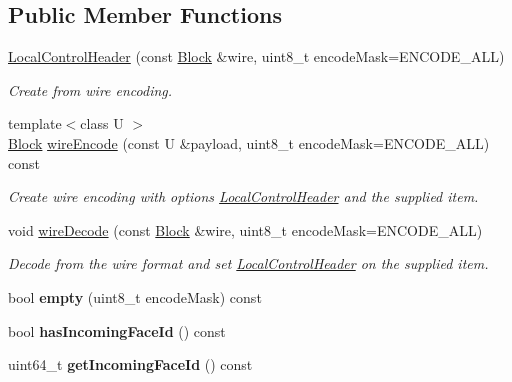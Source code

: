 \subsection*{Public Member Functions}
\begin{DoxyCompactItemize}
\item 
\hyperlink{classndn_1_1nfd_1_1LocalControlHeader_a6f3598290063fb83e55475dd2f8924c1}{Local\+Control\+Header} (const \hyperlink{classndn_1_1Block}{Block} \&wire, uint8\+\_\+t encode\+Mask=E\+N\+C\+O\+D\+E\+\_\+\+A\+LL)
\begin{DoxyCompactList}\small\item\em Create from wire encoding. \end{DoxyCompactList}\item 
{\footnotesize template$<$class U $>$ }\\\hyperlink{classndn_1_1Block}{Block} \hyperlink{classndn_1_1nfd_1_1LocalControlHeader_a04deac705d2498eaee39908230b994a8}{wire\+Encode} (const U \&payload, uint8\+\_\+t encode\+Mask=E\+N\+C\+O\+D\+E\+\_\+\+A\+LL) const
\begin{DoxyCompactList}\small\item\em Create wire encoding with options \hyperlink{classndn_1_1nfd_1_1LocalControlHeader}{Local\+Control\+Header} and the supplied item. \end{DoxyCompactList}\item 
void \hyperlink{classndn_1_1nfd_1_1LocalControlHeader_ab6fce3742d692d0f2b1c2a56234e95ac}{wire\+Decode} (const \hyperlink{classndn_1_1Block}{Block} \&wire, uint8\+\_\+t encode\+Mask=E\+N\+C\+O\+D\+E\+\_\+\+A\+LL)
\begin{DoxyCompactList}\small\item\em Decode from the wire format and set \hyperlink{classndn_1_1nfd_1_1LocalControlHeader}{Local\+Control\+Header} on the supplied item. \end{DoxyCompactList}\item 
bool {\bfseries empty} (uint8\+\_\+t encode\+Mask) const\hypertarget{classndn_1_1nfd_1_1LocalControlHeader_ae7271a522dcc884f6f8d51e674cabdcd}{}\label{classndn_1_1nfd_1_1LocalControlHeader_ae7271a522dcc884f6f8d51e674cabdcd}

\item 
bool {\bfseries has\+Incoming\+Face\+Id} () const\hypertarget{classndn_1_1nfd_1_1LocalControlHeader_aadd4a26c5f9a6c64d57b5d8a756eb66f}{}\label{classndn_1_1nfd_1_1LocalControlHeader_aadd4a26c5f9a6c64d57b5d8a756eb66f}

\item 
uint64\+\_\+t {\bfseries get\+Incoming\+Face\+Id} () const\hypertarget{classndn_1_1nfd_1_1LocalControlHeader_af79deefd9cac64ce920fc0e621081a9b}{}\label{classndn_1_1nfd_1_1LocalControlHeader_af79deefd9cac64ce920fc0e621081a9b}


\end{DoxyCompactItemize}
